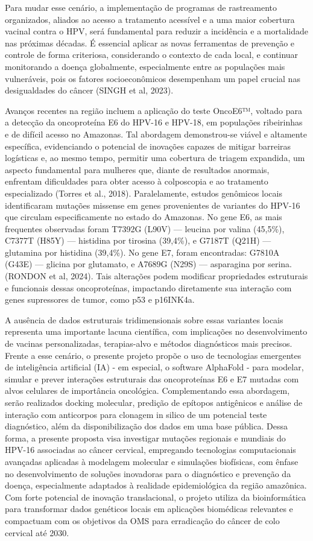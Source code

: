 Para mudar esse cenário, a implementação de programas de rastreamento organizados, aliados ao acesso a tratamento acessível e a uma maior cobertura vacinal contra o HPV, será fundamental para reduzir a incidência e a mortalidade nas próximas décadas. É essencial aplicar as novas ferramentas de prevenção e controle de forma criteriosa, considerando o contexto de cada local, e continuar monitorando a doença globalmente, especialmente entre as populações mais vulneráveis, pois os fatores socioeconômicos desempenham um papel crucial nas desigualdades do câncer (SINGH et al, 2023).

Avanços recentes na região incluem a aplicação do teste OncoE6™, voltado para a detecção da oncoproteína E6 do HPV-16 e HPV-18, em populações ribeirinhas e de difícil acesso no Amazonas. Tal abordagem demonstrou-se viável e altamente específica, evidenciando o potencial de inovações capazes de mitigar barreiras logísticas e, ao mesmo tempo, permitir uma cobertura de triagem expandida, um aspecto fundamental para mulheres que, diante de resultados anormais, enfrentam dificuldades para obter acesso à colposcopia e ao tratamento especializado (Torres et al., 2018).
Paralelamente, estudos genômicos locais identificaram mutações missense em genes provenientes de variantes do HPV-16 que circulam especificamente no estado do Amazonas. No gene E6, as mais frequentes observadas foram T7392G (L90V) — leucina por valina (45,5\%), C7377T (H85Y) — histidina por tirosina (39,4\%), e G7187T (Q21H) — glutamina por histidina (39,4\%). No gene E7, foram encontradas: G7810A (G43E) — glicina por glutamato, e A7689G (N29S) — asparagina por serina. (RONDON et al, 2024). Tais alterações podem modificar propriedades estruturais e funcionais dessas oncoproteínas, impactando diretamente sua interação com genes supressores de tumor, como p53 e p16INK4a.

A ausência de dados estruturais tridimensionais sobre essas variantes locais representa uma importante lacuna científica, com implicações no desenvolvimento de vacinas personalizadas, terapias-alvo e métodos diagnósticos mais precisos. Frente a esse cenário, o presente projeto propõe o uso de tecnologias emergentes de inteligência artificial (IA) - em especial, o software AlphaFold - para modelar, simular e prever interações estruturais das oncoproteínas E6 e E7 mutadas com alvos celulares de importância oncológica. Complementando essa abordagem, serão realizados docking molecular, predição de epítopos antigênicos e análise de interação com anticorpos para clonagem in silico de um potencial teste diagnóstico, além da disponibilização dos dados em uma base pública.
Dessa forma, a presente proposta visa investigar mutações regionais e mundiais do HPV-16 associadas ao câncer cervical, empregando tecnologias computacionais avançadas aplicadas à modelagem molecular e simulações biofísicas, com ênfase no desenvolvimento de soluções inovadoras para o diagnóstico e prevenção da doença, especialmente adaptados à realidade epidemiológica da região amazônica. 
Com forte potencial de inovação translacional, o projeto utiliza da bioinformática para transformar dados genéticos locais em aplicações biomédicas relevantes e compactuam com os objetivos da OMS para erradicação do câncer de colo cervical até 2030. 


